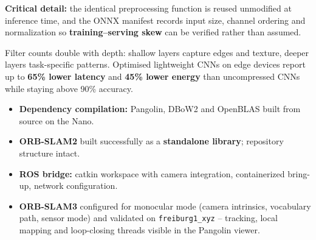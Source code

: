 {
	\textbf{Critical detail:} the identical preprocessing function is reused unmodified at inference time, and the ONNX manifest records input size, channel ordering and normalization so \textbf{training--serving skew} can be verified rather than assumed.
	
	Filter counts double with depth: shallow layers capture edges and texture, deeper layers task-specific patterns. Optimised lightweight CNNs on edge devices report up to \textbf{65\% lower latency} and \textbf{45\% lower energy} than uncompressed CNNs while staying above 90\% accuracy.
}
{
	\begin{itemize}
		\item \textbf{Dependency compilation:} Pangolin, DBoW2 and OpenBLAS built from source on the Nano.
		\item \textbf{ORB-SLAM2} built successfully as a \textbf{standalone library}; repository structure intact.
		\item \textbf{ROS bridge:} catkin workspace with camera integration, containerized bring-up, network configuration.
		\item \textbf{ORB-SLAM3} configured for monocular mode (camera intrinsics, vocabulary path, sensor mode) and validated on \texttt{freiburg1\_xyz} -- tracking, local mapping and loop-closing threads visible in the Pangolin viewer.
	\end{itemize}
}
